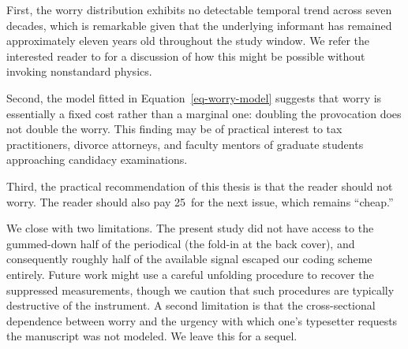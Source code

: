 \documentclass{cpthesis}
\begin{document}
First, the worry distribution exhibits no detectable temporal trend
across seven decades, which is remarkable given that the underlying
informant has remained approximately eleven years old throughout the
study window. We refer the interested reader to
\citet{kitchen2009art} for a discussion of how this might be possible
without invoking nonstandard physics.

Second, the model fitted in Equation~\ref{eq-worry-model} suggests
that worry is essentially a fixed cost rather than a marginal one:
doubling the provocation does not double the worry. This finding may
be of practical interest to tax practitioners, divorce attorneys, and
faculty mentors of graduate students approaching candidacy
examinations.

Third, the practical recommendation of this thesis is that the reader
should not worry. The reader should also pay 25\textcent\ for the
next issue, which remains ``cheap.''

We close with two limitations. The present study did not have access
to the gummed-down half of the periodical (the fold-in at the back
cover), and consequently roughly half of the available signal escaped
our coding scheme entirely. Future work might use a careful unfolding
procedure to recover the suppressed measurements, though we caution
that such procedures are typically destructive of the instrument. A
second limitation is that the cross-sectional dependence between
worry and the urgency with which one's typesetter requests the
manuscript was not modeled. We leave this for a sequel.

\newpage
{}
{}


\end{document}
